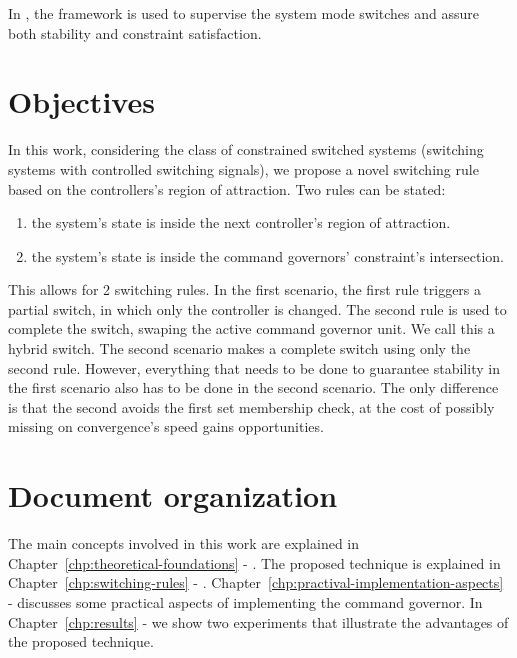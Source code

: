 In \parencite{franzè.lucia.ea:command,lucia.franzè:stabilization}, the \CG{}
framework is used to supervise the system mode switches and assure both
stability and constraint satisfaction.

\section{Objectives}%
\label{sec:objectives}

In this work, considering the class of constrained switched systems (switching
systems with controlled switching signals), we propose a novel switching rule
based on the controllers's region of attraction. Two rules can be stated:

\begin{enumerate}
  \item the system's state is inside the next controller's region of attraction.
  \item the system's state is inside the command governors' constraint's
        intersection.
\end{enumerate}

This allows for 2 switching rules. In the first scenario, the first rule
triggers a partial switch, in which only the controller is changed. The second
rule is used to complete the switch, swaping the active command governor unit.
We call this a hybrid switch. The second scenario makes a complete switch using
only the second rule. However, everything that needs to be done to guarantee
stability in the first scenario also has to be done in the second scenario. The
only difference is that the second avoids the first set membership check, at the
cost of possibly missing on convergence's speed gains opportunities.

\section{Document organization}%
\label{sec:organization}

The main concepts involved in this work are explained in
Chapter~\ref{chp:theoretical-foundations} -
. The proposed technique is explained in
Chapter~\ref{chp:switching-rules} - .
Chapter~\ref{chp:practival-implementation-aspects} -
 discusses some practical aspects
of implementing the command governor. In Chapter~\ref{chp:results} -
 we show two experiments that illustrate the advantages of
the proposed technique.
